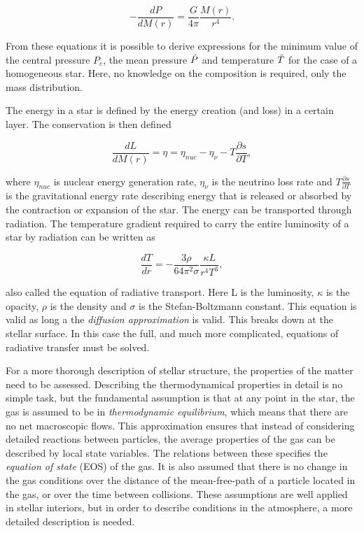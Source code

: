\begin{equation}
    -\frac{dP}{dM(r)} = \frac{G}{4\pi}\frac{M(r)}{r^4}.
    \end{equation}

\noindent From these equations it is possible to derive expressions for the minimum value of the central pressure $P_c$, the mean pressure $\Tilde{P}$ and temperature $\Tilde{T}$ for the case of a homogeneous star. Here, no knowledge on the composition is required, only the mass distribution.

The energy in a star is defined by the energy creation (and loss)  in a certain layer. The conservation is then defined

\begin{equation}
     \frac{dL}{dM(r)} = \eta = \eta_{nuc} - \eta_{\nu} - T\frac{\partial s}{\partial T},
\end{equation} 

\noindent where $\eta_{nuc}$ is nuclear energy generation rate, $\eta_{\nu}$ is the neutrino loss rate and $T\frac{\partial s}{\partial T}$ is the gravitational energy rate describing energy that is released or absorbed by the contraction or expansion of the star. The energy can be transported through radiation. The temperature gradient required to carry the entire luminosity of a star by radiation can be written as 

\begin{equation}
\label{transportradiative}
	\frac{dT}{dr} = -\frac{3 \rho}{64\pi^2 \sigma }\frac{\kappa L}{r^4 T^3},
\end{equation}

\noindent also called the equation of radiative transport. Here L is the luminosity, $\kappa$ is the opacity, $\rho$ is the density and $\sigma$ is the Stefan-Boltzmann constant. This equation is valid as long a the \textit{diffusion approximation} is valid. This breaks down at the stellar surface. In this case the full, and much more complicated, equations of radiative transfer must be solved.

For a more thorough description of stellar structure, the properties of the matter need to be assessed. Describing the thermodynamical properties in detail is no simple task, but the fundamental assumption is that at any point in the star, the gas is assumed to be in \textit{thermodynamic equilibrium}, which means that there are no net macroscopic flows. This approximation ensures that instead of considering detailed reactions between particles, the average properties of the gas can be described by local state variables. The relations between these specifies the \textit{equation of state} (EOS) of the gas. It is also assumed that there is no change in the gas conditions over the distance of the mean-free-path of a particle located in the gas, or over the time between collisions. These assumptions are well applied in stellar interiors, but in order to describe conditions in the atmosphere, a more detailed description is needed. 

